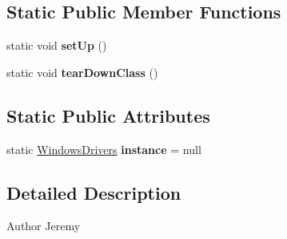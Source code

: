 \subsection*{Static Public Member Functions}
\begin{DoxyCompactItemize}
\item 
\hypertarget{classCASUAL_1_1WindowsDriversTest_a750bc7bfb1b5567bb64243056c4f8389}{static void {\bfseries set\-Up} ()}\label{classCASUAL_1_1WindowsDriversTest_a750bc7bfb1b5567bb64243056c4f8389}

\item 
\hypertarget{classCASUAL_1_1WindowsDriversTest_a1f784bbc0bdf942a32b2fdeb2810932f}{static void {\bfseries tear\-Down\-Class} ()}\label{classCASUAL_1_1WindowsDriversTest_a1f784bbc0bdf942a32b2fdeb2810932f}

\end{DoxyCompactItemize}
\subsection*{Static Public Attributes}
\begin{DoxyCompactItemize}
\item 
\hypertarget{classCASUAL_1_1WindowsDriversTest_a9ce49ef0c261cc0461c1182e951a5f57}{static \hyperlink{classCASUAL_1_1WindowsDrivers}{Windows\-Drivers} {\bfseries instance} = null}\label{classCASUAL_1_1WindowsDriversTest_a9ce49ef0c261cc0461c1182e951a5f57}

\end{DoxyCompactItemize}


\subsection{Detailed Description}
\begin{DoxyAuthor}{Author}
Jeremy 
\end{DoxyAuthor}


